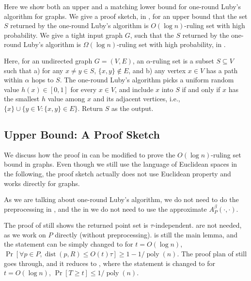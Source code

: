 \documentclass[11pt,letterpaper]{article}
\theoremstyle{plain}
\theoremstyle{definition}
\theoremstyle{remark}
\DeclareMathOperator{\poly}{poly}
\DeclareMathOperator{\dist}{dist}
\begin{document}
Here we show both an upper and a matching lower bound for one-round Luby's algorithm for graphs.
We give a proof sketch, in , for an upper bound that the set $S$ returned by the one-round Luby's algorithm is $O(\log n)$-ruling set with high probability.
We give a tight input graph $G$, such that the $S$ returned by the one-round Luby's algorithm is $\Omega(\log n)$-ruling set with high probability, in .


Here, for an undirected graph $G = (V, E)$, 
an $\alpha$-ruling set is a subset $S \subseteq V$ such that a) for any $x \neq y \in S$, $\{x, y\} \notin E$, and b)
any vertex $x \in V$ has a path within $\alpha$ hops to $S$.
The one-round Luby's algorithm picks a uniform random value $h(x) \in [0, 1]$ for every $x \in V$,
and include $x$ into $S$ if and only if $x$ has the smallest $h$ value among $x$ and its adjacent vertices, i.e., $\{x\} \cup \{ y \in V : \{x, y \} \in E \}$.
Return $S$ as the output.


\subsection{Upper Bound: A Proof Sketch}
\label{sec:luby_graph_ub}
We discuss how the proof in  can be modified to prove the $O(\log n)$-ruling set bound in graphs.
Even though we still use the language of Euclidean spaces in the following,
the proof sketch actually does not use Euclidean property and works directly for graphs.

As we are talking about one-round Luby's algorithm, we do not need to do the preprocessing in ,
and the in  we do not need to use the approximate $A_P^\beta(\cdot, \cdot)$.

The proof of  still shows the returned point set is $\tau$-independent.
 are not needed, as we work on $P$ directly (without preprocessing).
 is still the main lemma,
and the statement can be simply changed to for $t = O(\log n)$,
$\Pr[\forall p \in P, \dist(p, R) \leq O(t) \tau ] \geq 1- 1 / \poly(n)$.
The proof plan of  still goes through,
and it reduces to ,
where the statement is changed to for $t = O(\log n)$,
$\Pr[T \geq t] \leq 1 / \poly(n)$.
\end{document}
